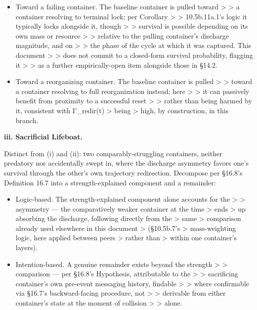 \documentclass[
]{article}
\begin{document}
\begin{itemize}
\item
  Toward a failing container. The baseline container is pulled toward
  \textgreater{} \textgreater{} a container resolving to terminal lock;
  per Corollary \textgreater{} \textgreater{} 10.5b.11a.1's logic it
  typically locks alongside it, though \textgreater{} \textgreater{}
  survival is possible depending on its own mass or resource
  \textgreater{} \textgreater{} relative to the pulling container's
  discharge magnitude, and on \textgreater{} \textgreater{} the phase of
  the cycle at which it was captured. This document \textgreater{}
  \textgreater{} does not commit to a closed-form survival probability,
  flagging it \textgreater{} \textgreater{} as a further
  empirically-open item alongside those in §14.2.
\item
  Toward a reorganizing container. The baseline container is pulled
  \textgreater{} \textgreater{} toward a container resolving to full
  reorganization instead; here \textgreater{} \textgreater{} it can
  passively benefit from proximity to a successful reset \textgreater{}
  \textgreater{} rather than being harmed by it, consistent with
  Γ\_redir(t) \textgreater{} being \textgreater{} high, by construction,
  in this branch.
\end{itemize}

\textbf{iii. Sacrificial Lifeboat.}

Distinct from (i) and (ii): two comparably-struggling containers,
neither predatory nor accidentally swept in, where the discharge
asymmetry favors one's survival through the other's own trajectory
redirection. Decompose per §16.8's Definition 16.7 into a
strength-explained component and a remainder:

\begin{itemize}
\item
  Logic-based. The strength-explained component alone accounts for the
  \textgreater{} \textgreater{} asymmetry --- the comparatively weaker
  container at the time \textgreater{} ends \textgreater{} up absorbing
  the discharge, following directly from the \textgreater{} same
  \textgreater{} comparison already used elsewhere in this document
  \textgreater{} (§10.5b.7's \textgreater{} mass-weighting logic, here
  applied between peers \textgreater{} rather than \textgreater{} within
  one container's layers).
\item
  Intention-based. A genuine remainder exists beyond the strength
  \textgreater{} \textgreater{} comparison --- per §16.8's Hypothesis,
  attributable to the \textgreater{} \textgreater{} sacrificing
  container's own pre-event messaging history, findable \textgreater{}
  \textgreater{} where confirmable via §16.7's backward-facing
  procedure, not \textgreater{} \textgreater{} derivable from either
  container's state at the moment of collision \textgreater{}
  \textgreater{} alone.
\end{itemize}
\end{document}
